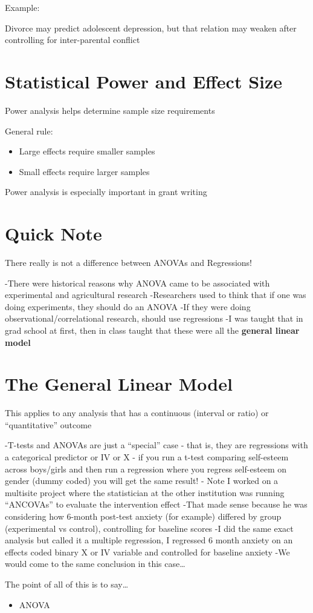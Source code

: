 \documentclass[
  letterpaper,
  DIV=11,
  numbers=noendperiod]{scrreprt}
\providecommand{\tightlist}{%
  \setlength{\itemsep}{0pt}\setlength{\parskip}{0pt}}
\begin{document}
Example:

Divorce may predict adolescent depression, but that relation may weaken
after controlling for inter-parental conflict


\chapter{Statistical Power and Effect
Size}\label{statistical-power-and-effect-size}

Power analysis helps determine sample size requirements

General rule:

\begin{itemize}
\tightlist
\item
  Large effects require smaller samples
\item
  Small effects require larger samples
\end{itemize}

Power analysis is especially important in grant writing


\chapter{Quick Note}\label{quick-note}

There really is not a difference between ANOVAs and Regressions!

-There were historical reasons why ANOVA came to be associated with
experimental and agricultural research -Researchers used to think that
if one was doing experiments, they should do an ANOVA -If they were
doing observational/correlational research, should use regressions -I
was taught that in grad school at first, then in class taught that these
were all the \textbf{general linear model}


\chapter{The General Linear Model}\label{the-general-linear-model}

This applies to any analysis that has a continuous (interval or ratio)
or ``quantitative'' outcome

-T-tests and ANOVAs are just a ``special'' case - that is, they are
regressions with a categorical predictor or IV or X - if you run a
t-test comparing self-esteem across boys/girls and then run a regression
where you regress self-esteem on gender (dummy coded) you will get the
same result! - Note I worked on a multisite project where the
statistician at the other institution was running ``ANCOVAs'' to
evaluate the intervention effect -That made sense because he was
considering how 6-month post-test anxiety (for example) differed by
group (experimental vs control), controlling for baseline scores -I did
the same exact analysis but called it a multiple regression, I regressed
6 month anxiety on an effects coded binary X or IV variable and
controlled for baseline anxiety -We would come to the same conclusion in
this case\ldots{}

The point of all of this is to say\ldots{}

\begin{itemize}
\tightlist
\item
  ANOVA
\end{itemize}
\end{document}
